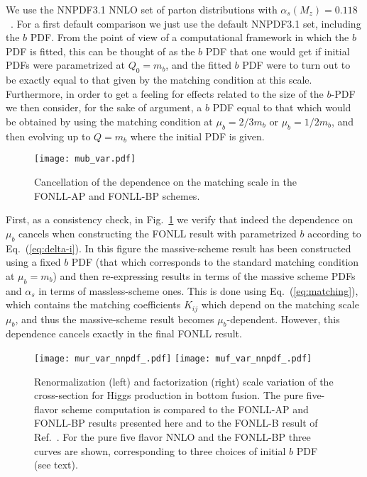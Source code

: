 We use the  NNPDF3.1 NNLO set of parton distributions with
$\alpha_s(M_z)=0.118$~\cite{Ball:2017nwa}. For a first default
comparison we just use the default NNPDF3.1 set, including the $b$
PDF. From the point of view of a computational framework in which the
$b$ PDF is fitted,
this can be thought of as the $b$ PDF that one would get if initial
PDFs were parametrized at $Q_0=m_b$, and the fitted $b$ PDF were to
turn out to be exactly equal to that given by the matching condition
at this scale. Furthermore, in order
to get a feeling for effects related to the size of
the $b$-PDF we then consider, for the sake of argument, a $b$ PDF
equal to that which would be obtained by using the matching condition
at $\mu_b = 2/3 m_b$ or $\mu_b = 1/2 m_b$, and then evolving up to
$Q=m_b$ where the initial PDF is given.

\begin{figure}[htbp]
  \centering
  \texttt{[image: mub\_var.pdf]}
  \caption{Cancellation of the dependence on the matching scale in the
  FONLL-AP and FONLL-BP schemes.}
  \label{fig:mub-var}
\end{figure}
First, as a consistency check, in Fig.~\ref{fig:mub-var} we verify that
indeed the dependence on $\mu_b$ cancels when constructing the FONLL
result with parametrized $b$ according to Eq.~(\ref{eq:delta-i}). In
this figure the massive-scheme result has been constructed using a
fixed  $b$ PDF (that which corresponds to the standard matching
condition at $\mu_b=m_b$) and then re-expressing results in terms of
the massive scheme PDFs  and $\alpha_s$ in terms of massless-scheme
ones. This is done using Eq.~(\ref{eq:matching}), which contains the
matching coefficients $K_{ij}$ which depend on the matching scale
$\mu_b$, and thus the massive-scheme result becomes
$\mu_b$-dependent.
However, this dependence cancels exactly in the final
FONLL result.

\begin{figure}[htbp]
  \centering
  \texttt{[image: mur\_var\_nnpdf\_.pdf]}
  \texttt{[image: muf\_var\_nnpdf\_.pdf]}
  \caption{Renormalization (left) and factorization (right) scale
    variation of the cross-section for Higgs production in bottom
    fusion. The pure five-flavor scheme computation is compared to the
  FONLL-AP and FONLL-BP results presented here and to the FONLL-B
  result of Ref.~\cite{Forte:2015hba}. For the pure five flavor
  NNLO and the  FONLL-BP three curves are shown, corresponding to 
  three choices of initial $b$ PDF (see text).
  }
  \label{fig:scale-var}
\end{figure}


